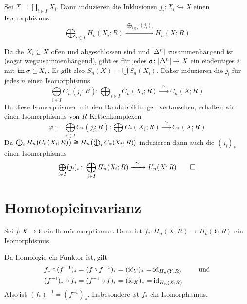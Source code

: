 \begin{satz}[{name=[{Homologie des Koproduktes topologischer Räume}]}]
	Sei $X = \coprod_{i \in I} X_i$. Dann induzieren die Inklusionen $j_i \colon X_i \hookrightarrow X$ einen Isomorphismus
	\[
		\bigoplus_{i \in I} H_n(X_i;R) \xrightarrow{\bigoplus_{i \in I} (j_i)_*}  H_n(X;R)
	\]
\end{satz}
\begin{beweis}
	Da die $X_i \subseteq X$ offen und abgeschlossen sind und $\abs*{\Delta^n}$ zusammenhängend ist (sogar wegzusammenhängend), gibt es für jedes 
	$\sigma \colon \abs*{\Delta^n} \to X $ ein eindeutiges $i$ mit $\im \sigma \subseteq  X_i$. Es gilt also $S_n(X) = {\dot{\bigcup}} S_n(X_i)$. Daher induzieren die $j_i$
	für jedes $n$ einen Isomorphismus
	\[
		{\textstyle\bigoplus\limits_{i \in I}} C_n(j_i;R) \colon \bigoplus_{i \in I}C_n(X_i;R) \xrightarrow{\enspace\cong \enspace} C_n(X;R) 
	\]
	Da diese Isomorphismen mit den Randabbildungen vertauschen, erhalten wir einen Isomorphismus von $R$-Kettenkomplexen
	\[
		\varphi := {\textstyle\bigoplus\limits_{i \in I}} C_*(j_i;R) \colon \bigoplus C_*(X_i;R) \xrightarrow{\enspace\cong \enspace} C_*(X;R)
	\]
	Da $\bigoplus_i H_n \enbrace[\big]{C_*(X_i;R)} \cong H_n \enbrace[\big]{\bigoplus_i C_*(X_i;R)}$ induzieren dann auch die $(j_i)_*$ einen Isomorphismus
	\[
		{\textstyle\bigoplus\limits_{i \in I}} (j_i)_* \colon \bigoplus_{i \in I} H_n(X_i;R) \xrightarrow{\enspace\cong \enspace} H_n(X;R) \qedhere
	\]
\end{beweis}

\newpage

\section{Homotopieinvarianz} %
\label{sec:7}

\begin{bemerkung}[{name=[Die induzierte Abbildung eines Homöomorphismus ist ein Isomorphismus]}]
	Sei $f \colon X \to Y$ ein Homöomorphismus. Dann ist 
	\(
		f_* \colon H_n(X;R) \longrightarrow H_n(Y;R)
	\)
	ein Isomorphismus.
\end{bemerkung}
\begin{beweis}
	Da Homologie ein Funktor ist, gilt
	\begin{align*}
		f_* \circ (f^{-1})_* &= (f \circ f ^{-1})_* = (\id_Y)_* = \id_{H_n(Y;R)} \qquad \text{ und} \\
		(f ^{-1})_* \circ f_* &= (f ^{-1} \circ f)_* = (\id_X)_* = \id_{H_n(X;R)}
	\end{align*}
	Also ist $(f_*)^{-1}=(f ^{-1})_*$. Insbesondere ist $f_*$ ein Isomorphismus.
\end{beweis}

